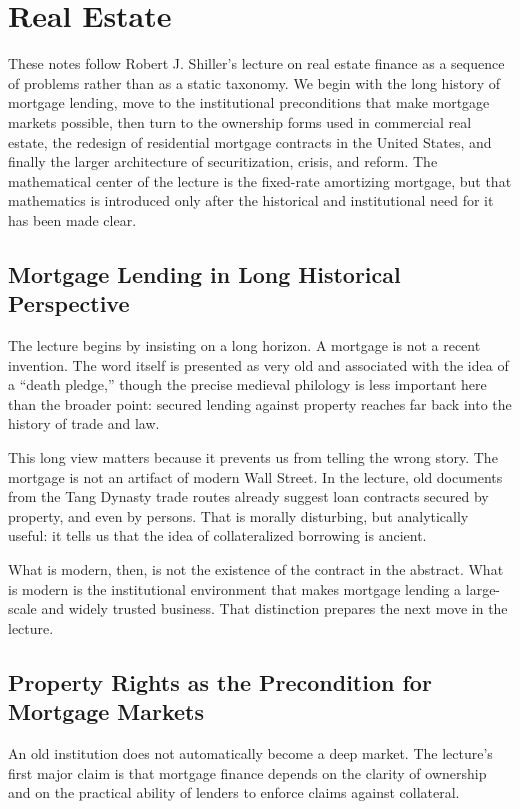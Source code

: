 \chapter{Real Estate}

These notes follow Robert J. Shiller's lecture on real estate finance as a sequence of problems rather than as a static taxonomy. We begin with the long history of mortgage lending, move to the institutional preconditions that make mortgage markets possible, then turn to the ownership forms used in commercial real estate, the redesign of residential mortgage contracts in the United States, and finally the larger architecture of securitization, crisis, and reform. The mathematical center of the lecture is the fixed-rate amortizing mortgage, but that mathematics is introduced only after the historical and institutional need for it has been made clear.

\section{Mortgage Lending in Long Historical Perspective}

The lecture begins by insisting on a long horizon. A mortgage is not a recent invention. The word itself is presented as very old and associated with the idea of a ``death pledge,'' though the precise medieval philology is less important here than the broader point: secured lending against property reaches far back into the history of trade and law.

This long view matters because it prevents us from telling the wrong story. The mortgage is not an artifact of modern Wall Street. In the lecture, old documents from the Tang Dynasty trade routes already suggest loan contracts secured by property, and even by persons. That is morally disturbing, but analytically useful: it tells us that the idea of collateralized borrowing is ancient.

What is modern, then, is not the existence of the contract in the abstract. What is modern is the institutional environment that makes mortgage lending a large-scale and widely trusted business. That distinction prepares the next move in the lecture.

\section{Property Rights as the Precondition for Mortgage Markets}

An old institution does not automatically become a deep market. The lecture's first major claim is that mortgage finance depends on the clarity of ownership and on the practical ability of lenders to enforce claims against collateral.

